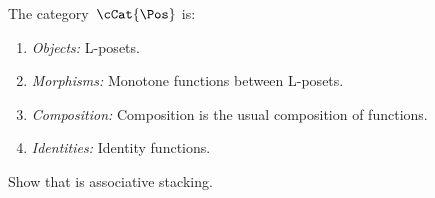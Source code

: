     \begin{definition}
        \label{def:PosL}
        The category~$\cCat{\Pos}$ is:
        \begin{enumerate}
            \item \emph{Objects:} L-posets.
            \item \emph{Morphisms:}
                  Monotone functions between L-posets.
            \item \emph{Composition:}
                  Composition is the usual composition of functions.
            \item \emph{Identities:}
                  Identity functions.
        \end{enumerate}
    \end{definition}

    \begin{lemma}
        Show that \cCat{\Pos} is associative stacking.
    \end{lemma}

